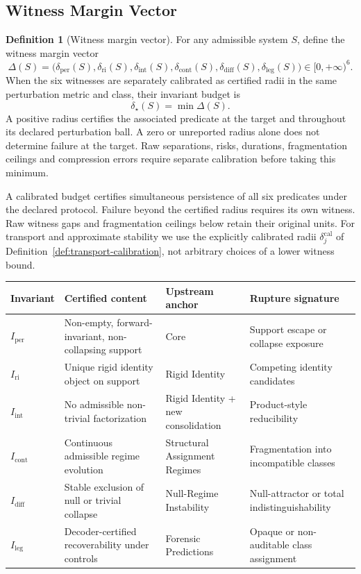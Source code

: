 \documentclass[11pt,a4paper]{article}
\theoremstyle{definition}
\newtheorem{definition}[theorem]{Definition}
\newcommand{\Iper}{I_{\mathrm{per}}}
\newcommand{\Iri}{I_{\mathrm{ri}}}
\newcommand{\Iint}{I_{\mathrm{int}}}
\newcommand{\Icont}{I_{\mathrm{cont}}}
\newcommand{\Idiff}{I_{\mathrm{diff}}}
\newcommand{\Ileg}{I_{\mathrm{leg}}}
\begin{document}
\subsection{Witness Margin Vector}
\begin{definition}[Witness margin vector]\label{def:margins}
For any admissible system $S$, define the witness margin vector
\[
\Delta(S)
=
\bigl(
\delta_{\mathrm{per}}(S),
\delta_{\mathrm{ri}}(S),
\delta_{\mathrm{int}}(S),
\delta_{\mathrm{cont}}(S),
\delta_{\mathrm{diff}}(S),
\delta_{\mathrm{leg}}(S)
\bigr)
\in [0,+\infty)^6.
\]
When the six witnesses are separately calibrated as certified radii in the same perturbation metric and class, their invariant budget is
\[
\delta_\star(S)=\min\Delta(S).
\]
A positive radius certifies the associated predicate at the target and throughout its declared perturbation ball. A zero or unreported radius alone does not determine failure at the target. Raw separations, risks, durations, fragmentation ceilings and compression errors require separate calibration before taking this minimum.
\end{definition}

A calibrated budget certifies simultaneous persistence of all six predicates under the declared protocol. Failure beyond the certified radius requires its own witness. Raw witness gaps and fragmentation ceilings below retain their original units. For transport and approximate stability we use the explicitly calibrated radii $\delta_j^{\mathrm{cal}}$ of Definition~\ref{def:transport-calibration}, not arbitrary choices of a lower witness bound.

\begin{center}
\small
\renewcommand{\arraystretch}{1.14}
\setlength{\tabcolsep}{4.5pt}
\begin{tabularx}{\textwidth}{>{\raggedright\arraybackslash}p{1.45cm} Y >{\raggedright\arraybackslash}p{2.8cm} >{\raggedright\arraybackslash}p{3.15cm}}
\toprule
Invariant & Certified content & Upstream anchor & Rupture signature \\
\midrule
$\Iper$ & Non-empty, forward-invariant, non-collapsing support & Core \cite{core} & Support escape or collapse exposure \\
$\Iri$ & Unique rigid identity object on support & Rigid Identity \cite{paper1} & Competing identity candidates \\
$\Iint$ & No admissible non-trivial factorization & Rigid Identity + new consolidation & Product-style reducibility \\
$\Icont$ & Continuous admissible regime evolution & Structural Assignment Regimes \cite{paper2} & Fragmentation into incompatible classes \\
$\Idiff$ & Stable exclusion of null or trivial collapse & Null-Regime Instability \cite{paper3} & Null-attractor or total indistinguishability \\
$\Ileg$ & Decoder-certified recoverability under controls & Forensic Predictions \cite{paper4} & Opaque or non-auditable class assignment \\
\bottomrule
\end{tabularx}
\end{center}
\end{document}
